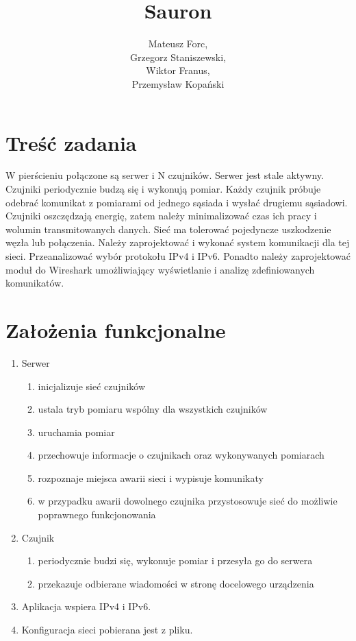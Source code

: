 \documentclass[a4paper,11pt]{article}
\title{Sauron}
\author{Mateusz Forc, \\ Grzegorz Staniszewski, \\ Wiktor Franus, \\ Przemysław Kopański}
\begin{document}

\maketitle
\tableofcontents

\newpage
\section{Treść zadania}
W pierścieniu połączone są serwer i N czujników.
Serwer jest stale aktywny. Czujniki periodycznie budzą się i wykonują pomiar.
Każdy czujnik próbuje odebrać komunikat z pomiarami od jednego sąsiada i wysłać drugiemu sąsiadowi.
Czujniki oszczędzają energię, zatem należy minimalizować czas ich pracy i wolumin
transmitowanych danych.
Sieć ma tolerować pojedyncze uszkodzenie węzła lub połączenia.
Należy zaprojektować i wykonać system komunikacji dla tej sieci.
Przeanalizować wybór protokołu IPv4 i IPv6.
Ponadto należy zaprojektować moduł do Wireshark umożliwiający wyświetlanie i analizę
zdefiniowanych komunikatów.

\section{Założenia funkcjonalne}

\begin{enumerate}
  \item Serwer
  \begin{enumerate}
    \item inicjalizuje sieć czujników
    \item ustala tryb pomiaru wspólny dla wszystkich czujników
    \item uruchamia pomiar
    \item przechowuje informacje o czujnikach oraz wykonywanych pomiarach
    \item rozpoznaje miejsca awarii sieci i wypisuje komunikaty
    \item w przypadku awarii dowolnego czujnika przystosowuje sieć do możliwie poprawnego funkcjonowania
  \end{enumerate}
  \item Czujnik
  \begin{enumerate}
    \item periodycznie budzi się, wykonuje pomiar i przesyła go do serwera
    \item przekazuje odbierane wiadomości w stronę docelowego urządzenia
  \end{enumerate}
  \item Aplikacja wspiera IPv4 i IPv6.
  \item Konfiguracja sieci pobierana jest z pliku.
\end{enumerate}
\end{document}
